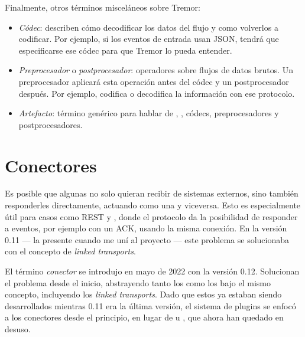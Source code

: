 Finalmente, otros términos misceláneos sobre Tremor:

\begin{itemize}
    \item \emph{Códec}: describen cómo decodificar los datos del flujo y como
        volverlos a codificar. Por ejemplo, si los eventos de entrada usan JSON,
        tendrá que especificarse ese códec para que Tremor lo pueda entender.

    \item \emph{Preprocesador} o \emph{postprocesador}: operadores sobre flujos
        de datos brutos. Un preprocesador aplicará esta operación antes del
        códec y un postprocesador después. Por ejemplo,  codifica o
        decodifica la información con ese protocolo.

    \item \emph{Artefacto}: término genérico para hablar de \sinks, \sources,
        códecs, preprocesadores y postprocesadores.

\end{itemize}

\section{Conectores}

Es posible que algunas \onramps no solo quieran recibir de sistemas externos,
sino también responderles directamente, actuando como una \offramp y viceversa.
Esto es especialmente útil para casos como REST y \websockets, donde el
protocolo da la posibilidad de responder a eventos, por ejemplo con un ACK,
usando la misma conexión. En la versión 0.11 --- la presente cuando me uní al
proyecto --- este problema se solucionaba con el concepto de \emph{linked
transports}.

El término \emph{conector} se introdujo en mayo de 2022 con la versión 0.12.
Solucionan el problema desde el inicio, abstrayendo tanto los \onramps como los
\offramps bajo el mismo concepto, incluyendo los \emph{linked transports}. Dado
que estos ya estaban siendo desarrollados mientras 0.11 era la última versión,
el sistema de plugins se enfocó a los conectores desde el principio, en lugar de
\onramps u \offramps, que ahora han quedado en desuso.
